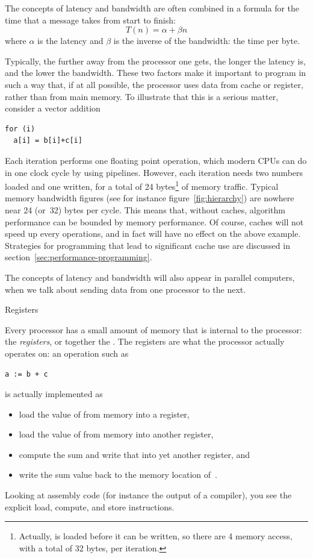 The concepts of latency and bandwidth are often combined in a formula
for the time that a message takes from start to finish:
\[ T(n) = \alpha+\beta n \]
where $\alpha$ is the latency and $\beta$ is the inverse of the
bandwidth: the time per byte.

Typically, the further away from the processor one gets, the longer
the latency is, and the lower the bandwidth.
These two factors make it important to program in such a
way that, if at all possible, the processor uses data from cache or register,
rather than from main memory. To illustrate that this is a serious
matter, consider a vector addition
\begin{verbatim}
for (i)
  a[i] = b[i]+c[i]
\end{verbatim}
Each iteration performs one floating point operation, which modern
CPUs can do in one clock cycle by using pipelines. However, each
iteration needs two numbers loaded and one written, for a total of 24
bytes\footnote{Actually,  is loaded before it can be written,
so there are 4 memory access, with a total of 32 bytes, per
iteration.} of memory traffic. Typical memory bandwidth figures (see
for instance figure~\ref{fig:hierarchy}) are nowhere near 24 (or~32) bytes per
cycle. This means that, without caches, algorithm performance can be
bounded by memory performance. Of course, caches will not speed up
every operations, and in fact will have no effect on the above
example. Strategies for programming that lead to significant cache use
are discussed in section~\ref{sec:performance-programming}.

The concepts of latency and bandwidth will also appear in parallel
computers, when we talk about sending data from one processor to the
next.

 {Registers}

Every processor has a small amount of memory that is internal to the
processor: the \emph{registers}, or together the
. The registers are what the processor
actually operates on: an operation such as 
\begin{verbatim}
a := b + c
\end{verbatim}
is actually implemented as 
\begin{itemize}
\item load the value of  from memory into a register,
\item load the value of  from memory into another register,
\item compute the sum and write that into yet another register, and
\item write the sum value back to the memory location of~.
\end{itemize}
Looking at assembly code (for instance the output of a compiler), you
see the explicit load, compute, and store instructions.

